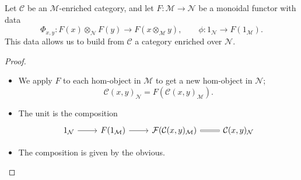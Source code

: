 \documentclass[main.tex]{subfiles}
\begin{document}
\begin{lemma}
  \label{lemma:monoidal_functor_switches_enrichment}
  Let $\mathcal{C}$ be an $\mathcal{M}$-enriched category, and let $F\colon \mathcal{M} \to \mathcal{N}$ be a monoidal functor with data
  \begin{equation*}
    \Phi_{x, y}\colon F(x) \otimes_{\mathcal{N}} F(y) \to F(x \otimes_{\mathcal{M}} y),\qquad \phi\colon 1_{\mathcal{N}} \to F(1_{\mathcal{M}}).
  \end{equation*}
  This data allows us to build from $\mathcal{C}$ a category enriched over $\mathcal{N}$.
\end{lemma}
\begin{proof}
  \leavevmode
  \begin{itemize}
    \item We apply $F$ to each hom-object in $\mathcal{M}$ to get a new hom-object in $\mathcal{N}$;
      \begin{equation*}
        \mathcal{C}(x, y)_{\mathcal{N}} = F(\mathcal{C}(x, y)_{\mathcal{M}}).
      \end{equation*}

    \item The unit is the composition
      \begin{equation*}
        \begin{tikzcd}
          1_{\mathcal{N}}
          \arrow[r]
          & F(1_{\mathcal{M}})
          \arrow[r]
          & \mathcal{F}(\mathcal{C}(x, y)_{\mathcal{M}})
          \arrow[r, equals]
          & \mathcal{C}(x, y)_{\mathcal{N}}
        \end{tikzcd}
      \end{equation*}

    \item The composition is given by the obvious.
  \end{itemize}
\end{proof}
\end{document}
